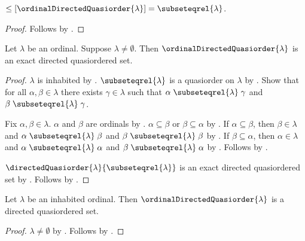 \begin{proposition}\label{ordinal_directed_quasiorder_relation}
    $\leq[\ordinalDirectedQuasiorder{\lambda}]
        =\subseteqrel{\lambda}$.
\end{proposition}
\begin{proof}
    Follows by
        .
\end{proof}

\begin{theorem}\label{ordinal_directed_quasiorder_is_exact}
    Let $\lambda$ be an ordinal.
    Suppose $\lambda\neq\emptyset$.
    Then $\ordinalDirectedQuasiorder{\lambda}$ is an exact
        directed quasiordered set.
\end{theorem}
\begin{proof}
    $\lambda$ is inhabited by .
    $\subseteqrel{\lambda}$ is a quasiorder on $\lambda$ by
        .
    Show that for all $\alpha,\beta\in\lambda$ there exists
        $\gamma\in\lambda$ such that
        $\alpha\mathrel{\subseteqrel{\lambda}}\gamma$ and
        $\beta\mathrel{\subseteqrel{\lambda}}\gamma$.
    \begin{subproof}
        Fix $\alpha,\beta\in\lambda$.
        $\alpha$ and $\beta$ are ordinals by
            .
        $\alpha\subseteq\beta$ or $\beta\subseteq\alpha$ by
            .
        If $\alpha\subseteq\beta$, then
            $\beta\in\lambda$ and
            $\alpha\mathrel{\subseteqrel{\lambda}}\beta$ and
            $\beta\mathrel{\subseteqrel{\lambda}}\beta$ by
            .
        If $\beta\subseteq\alpha$, then
            $\alpha\in\lambda$ and
            $\alpha\mathrel{\subseteqrel{\lambda}}\alpha$ and
            $\beta\mathrel{\subseteqrel{\lambda}}\alpha$ by
            .
        Follows by \auto.
    \end{subproof}
    $\directedQuasiorder{\lambda}{\subseteqrel{\lambda}}$ is an exact
        directed quasiordered set by
        .
    Follows by .
\end{proof}

\begin{classification}\label{ordinal_directed_quasiorder_is_directed}
    Let $\lambda$ be an inhabited ordinal.
    Then $\ordinalDirectedQuasiorder{\lambda}$ is a directed
        quasiordered set.
\end{classification}
\begin{proof}
    $\lambda\neq\emptyset$ by .
    Follows by .
\end{proof}


